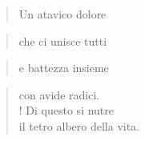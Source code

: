 
\begin{verse}
    Un atavico dolore\\
\end{verse}
\vspace{-0.9cm}
    \begin{verse} che ci unisce \hfill tutti\end{verse}
\vspace{-0.9cm}
    \begin{verse} e battezza \hfill insieme\end{verse}
\vspace{-0.9cm}
\begin{verse}
    con avide radici.\\!
    Di questo si nutre\\
    il tetro albero della vita.
\end{verse}